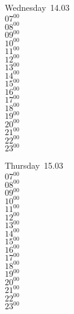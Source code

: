 \documentclass[11pt, a4paper]{book}\usepackage[]{graphicx}\usepackage[]{color}
\begin{document}
\begin{weekdaybox}
  Wednesday~14.03\\
  { 
  \vfill
  $07^{00}$\\
$08^{00}$\\
$09^{00}$\\
$10^{00}$\\
$11^{00}$\\
$12^{00}$\\
$13^{00}$\\
$14^{00}$\\
$15^{00}$\\
$16^{00}$\\
$17^{00}$\\
$18^{00}$\\
$19^{00}$\\
$20^{00}$\\
$21^{00}$\\
$22^{00}$\\
$23^{00}$\\
  }
\end{weekdaybox}
\clearpage
\begin{headerbox}
\end{headerbox}
\begin{weekdaybox}
  Thursday~15.03\\
  { 
  \vfill
  $07^{00}$\\
$08^{00}$\\
$09^{00}$\\
$10^{00}$\\
$11^{00}$\\
$12^{00}$\\
$13^{00}$\\
$14^{00}$\\
$15^{00}$\\
$16^{00}$\\
$17^{00}$\\
$18^{00}$\\
$19^{00}$\\
$20^{00}$\\
$21^{00}$\\
$22^{00}$\\
$23^{00}$\\
  }
\end{weekdaybox} 
\end{document}

